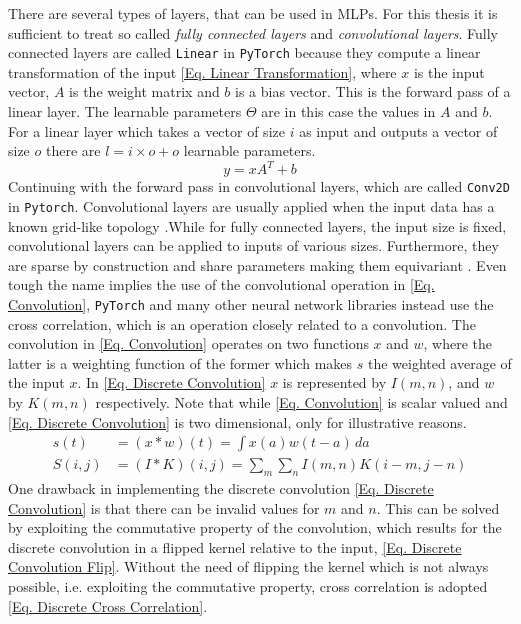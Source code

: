 There are several types of layers, that can be used in MLPs. For this thesis it is sufficient to treat so called \textit{fully connected layers} and \textit{convolutional layers}.
Fully connected layers are called \texttt{Linear}\cite{bibid} in \texttt{PyTorch}\cite{bibid} because they compute a linear transformation of the input \cref{Eq. Linear Transformation}, where \(x\) is the input vector, \(A\) is the weight matrix and \(b\) is a bias vector. This is the forward pass of a linear layer. The learnable parameters \(\Theta\) are in this case the values in \(A\) and \(b\). For a linear layer which takes a vector of size \(i\) as input and outputs a vector of size \(o\) there are \(l = i \times o + o\) learnable parameters. 
\begin{equation}
	y = xA^T + b \label{Eq. Linear Transformation}
\end{equation}
Continuing with the forward pass in convolutional layers, which are called \texttt{Conv2D}\cite{bibid} in \texttt{Pytorch}. Convolutional layers are usually applied when the input data has a known grid-like topology \cite{Goodfellow}.While for fully connected layers, the input size is fixed, convolutional layers can be applied to inputs of various sizes. Furthermore, they are sparse by construction and share parameters making them equivariant \cite{Goodfellow}.  Even tough the name implies the use of the convolutional operation in \cref{Eq. Convolution}, \texttt{PyTorch} and many other neural network libraries instead use the cross correlation, which is an operation closely related to a convolution\cite{Goodfellow}\cite{Pytorch website}. The convolution in \ref{Eq. Convolution} operates on two functions \(x\) and \(w\), where the latter is a weighting function of the former which makes \(s\) the weighted average of the input \(x\). In \cref{Eq. Discrete Convolution} \(x\) is represented by \(I(m,n)\), and \(w\) by \(K(m,n)\) respectively. Note that while \cref{Eq. Convolution} is scalar valued and \cref{Eq. Discrete Convolution} is two dimensional, only for illustrative reasons. 
\begin{align}
	s(t) &= (x * w)(t) = \int x(a)w(t-a)\,da \label{Eq. Convolution}\\
	S(i,j) &= (I * K)(i,j) = \sum_{m}\sum_{n}I(m,n)K(i-m,j-n)
	\label{Eq. Discrete Convolution}
\end{align}
One drawback in implementing the discrete convolution \cref{Eq. Discrete Convolution} is that there can be invalid values for \(m\) and \(n\). This can be solved by exploiting the commutative property of the convolution, which results for the discrete convolution in a flipped kernel relative to the input, \cref{Eq. Discrete Convolution Flip}. Without the need of flipping the kernel which is not always possible, i.e. exploiting the commutative property, cross correlation is adopted \cref{Eq. Discrete Cross Correlation}.
